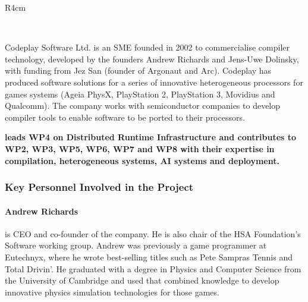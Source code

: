 \documentclass[a4paper,11pt]{article}
\newcommand{\project}[1]{\textbf{#1}\xspace}
\newcommand{\BLESS}{\project{BLeSS}}
\newcommand{\TheProject}{\BLESS}
\begin{document}

\begin{wrapfigure}{R}{4cm}
\vspace{-2cm}
\hfill {}
\vspace{-1cm}
\end{wrapfigure}

\ 

Codeplay Software Ltd. is an SME founded in 2002 to commercialise compiler technology, developed by the founders Andrew Richards and Jens-Uwe Dolinsky, with funding from Jez San (founder of Argonaut and Arc).  
Codeplay has produced software solutions for a series of innovative heterogeneous processors for games systems (Ageia PhysX, PlayStation 2, PlayStation 3, Movidius and Qualcomm). The company works with semiconductor companies to develop compiler tools to enable software to be ported to their processors. 

\vspace{10pt}
\textbf{\CODEPLAYshort{} leads WP4 on Distributed Runtime Infrastructure and contributes to WP2, WP3, WP5, WP6, WP7 and WP8 with their expertise in compilation, heterogeneous systems, AI systems and deployment.}
\vspace{10pt}

\subsubsection*{Key Personnel Involved in the Project}
\paragraph {Andrew Richards} is CEO and co-founder of the company. He is also chair of the HSA Foundation’s Software working group. Andrew was previously a game programmer at Eutechnyx, where he wrote best-selling titles such as Pete Sampras Tennis and Total Drivin’. He graduated with a degree in Physics and Computer Science from the University of Cambridge and used that combined knowledge to develop innovative physics simulation technologies for those games.
\end{document}
